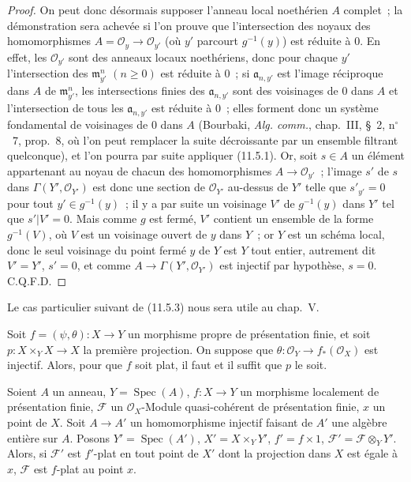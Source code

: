 \begin{proof}

On peut donc désormais supposer l'anneau local noethérien $A$ complet~; la
démonstration sera achevée si l'on prouve que l'intersection des noyaux des
homomorphismes $A=\mathcal O_y\to\mathcal O_{y'}$ (où $y'$ parcourt
$g^{-1}(y)$) est réduite à $0$. En effet, les $\mathcal O_{y'}$ sont des anneaux
locaux noethériens, donc pour chaque $y'$ l'intersection des
$\mathfrak m_{y'}^n$ $(n\geq0)$ est réduite à $0$~; si $\mathfrak a_{n,y'}$ est
l'image réciproque dans $A$ de $\mathfrak m_{y'}^n$, les intersections finies
des $\mathfrak a_{n,y'}$ sont des voisinages de $0$ dans $A$ et l'intersection de
tous les $\mathfrak a_{n,y'}$ est réduite à $0$~; elles forment donc un système
fondamental de voisinages de $0$ dans $A$ (Bourbaki, \emph{Alg. comm.}, chap.~III,
\S~2, n$^\circ$~7, prop.~8, où l'on peut remplacer la suite décroissante par un
ensemble filtrant quelconque), et l'on pourra par suite appliquer (11.5.1).
Or, soit $s\in A$ un élément appartenant au noyau de chacun des homomorphismes
$A\to\mathcal O_{y'}$~; l'image $s'$ de $s$ dans
$\Gamma(Y',\mathcal O_{Y'})$ est donc une section de $\mathcal O_{Y'}$ au-dessus
de $Y'$ telle que $s'_{y'}=0$ pour tout $y'\in g^{-1}(y)$~; il y a par suite un
voisinage $V'$ de $g^{-1}(y)$ dans $Y'$ tel que $s'|V'=0$. Mais comme $g$ est
fermé, $V'$ contient un ensemble de la forme $g^{-1}(V)$, où $V$ est un
voisinage ouvert de $y$ dans $Y$~; or $Y$ est un schéma local, donc le seul
voisinage du point fermé $y$ de $Y$ est $Y$ tout entier, autrement dit $V'=Y'$,
$s'=0$, et comme $A\to\Gamma(Y',\mathcal O_{Y'})$ est injectif par hypothèse,
$s=0$. C.Q.F.D.
\end{proof}

Le cas particulier suivant de (11.5.3) nous sera utile au chap.~V.

\begin{corollary}[11.5.4]
\label{IV.11.5.4-fr}
Soit $f=(\psi,\theta):X\to Y$ un morphisme propre de présentation finie, et
soit $p:X\times_YX\to X$ la première projection. On suppose que
$\theta:\mathcal O_Y\to f_*(\mathcal O_X)$ est injectif. Alors, pour que $f$
soit plat, il faut et il suffit que $p$ le soit.
\end{corollary}

\begin{proposition}[11.5.5]
\label{IV.11.5.5-fr}
Soient $A$ un anneau, $Y=\operatorname{Spec}(A)$, $f:X\to Y$ un morphisme
localement de présentation finie, $\mathcal F$ un $\mathcal O_X$-Module
quasi-cohérent de présentation finie, $x$ un point de $X$. Soit
$A\to A'$ un homomorphisme injectif faisant de $A'$ une algèbre entière sur $A$.
Posons $Y'=\operatorname{Spec}(A')$, $X'=X\times_Y Y'$, $f'=f\times1$,
$\mathcal F'=\mathcal F\otimes_Y Y'$. Alors, si $\mathcal F'$ est $f'$-plat en
tout point de $X'$ dont la projection dans $X$ est égale à $x$, $\mathcal F$ est
$f$-plat au point $x$.
\end{proposition}


